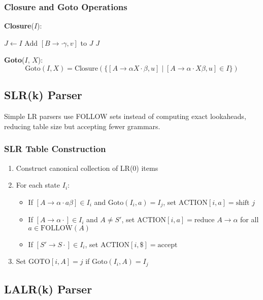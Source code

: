 \subsubsection{Closure and Goto Operations}
\textbf{Closure}($I$):
\begin{algorithmic}
\State $J \gets I$
\Repeat
                \State Add $[B \to \cdot \gamma, v]$ to $J$
            \EndFor
        \EndFor
    \EndFor
{}
\State \Return $J$
\end{algorithmic}

\textbf{Goto}($I$, $X$):
$$\text{Goto}(I, X) = \text{Closure}(\{[A \to \alpha X \cdot \beta, u] \mid [A \to \alpha \cdot X\beta, u] \in I\})$$

\subsection{SLR(k) Parser}

Simple LR parsers use FOLLOW sets instead of computing exact lookaheads, reducing table size but accepting fewer grammars.

\subsubsection{SLR Table Construction}
\begin{enumerate}
    \item Construct canonical collection of LR(0) items
    \item For each state $I_i$:
        \begin{itemize}
            \item If $[A \to \alpha \cdot a\beta] \in I_i$ and $\text{Goto}(I_i, a) = I_j$, set $\text{ACTION}[i,a] = \text{shift } j$
            \item If $[A \to \alpha \cdot] \in I_i$ and $A \neq S'$, set $\text{ACTION}[i,a] = \text{reduce } A \to \alpha$ for all $a \in \text{FOLLOW}(A)$
            \item If $[S' \to S \cdot] \in I_i$, set $\text{ACTION}[i,\$] = \text{accept}$
        \end{itemize}
    \item Set $\text{GOTO}[i,A] = j$ if $\text{Goto}(I_i, A) = I_j$
\end{enumerate}

\subsection{LALR(k) Parser}

